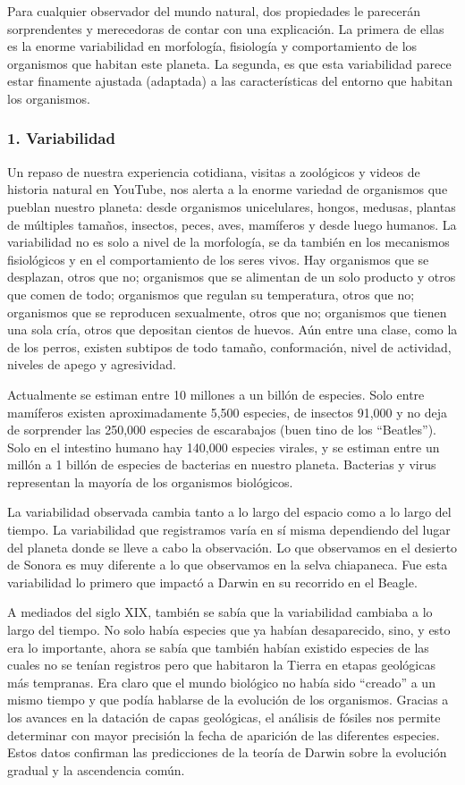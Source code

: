 \documentclass[
  a4paper,
  DIV=11,
  numbers=noendperiod]{scrreprt}
\begin{document}
Para cualquier observador del mundo natural, dos propiedades le
parecerán sorprendentes y merecedoras de contar con una explicación. La
primera de ellas es la enorme variabilidad en morfología, fisiología y
comportamiento de los organismos que habitan este planeta. La segunda,
es que esta variabilidad parece estar finamente ajustada (adaptada) a
las características del entorno que habitan los organismos.

\subsubsection{1. Variabilidad}\label{variabilidad}

Un repaso de nuestra experiencia cotidiana, visitas a zoológicos y
videos de historia natural en YouTube, nos alerta a la enorme variedad
de organismos que pueblan nuestro planeta: desde organismos
unicelulares, hongos, medusas, plantas de múltiples tamaños, insectos,
peces, aves, mamíferos y desde luego humanos. La variabilidad no es solo
a nivel de la morfología, se da también en los mecanismos fisiológicos y
en el comportamiento de los seres vivos. Hay organismos que se
desplazan, otros que no; organismos que se alimentan de un solo producto
y otros que comen de todo; organismos que regulan su temperatura, otros
que no; organismos que se reproducen sexualmente, otros que no;
organismos que tienen una sola cría, otros que depositan cientos de
huevos. Aún entre una clase, como la de los perros, existen subtipos de
todo tamaño, conformación, nivel de actividad, niveles de apego y
agresividad.

Actualmente se estiman entre 10 millones a un billón de especies. Solo
entre mamíferos existen aproximadamente 5,500 especies, de insectos
91,000 y no deja de sorprender las 250,000 especies de escarabajos (buen
tino de los ``Beatles''). Solo en el intestino humano hay 140,000
especies virales, y se estiman entre un millón a 1 billón de especies de
bacterias en nuestro planeta. Bacterias y virus representan la mayoría
de los organismos biológicos.

La variabilidad observada cambia tanto a lo largo del espacio como a lo
largo del tiempo. La variabilidad que registramos varía en sí misma
dependiendo del lugar del planeta donde se lleve a cabo la observación.
Lo que observamos en el desierto de Sonora es muy diferente a lo que
observamos en la selva chiapaneca. Fue esta variabilidad lo primero que
impactó a Darwin en su recorrido en el Beagle.

A mediados del siglo XIX, también se sabía que la variabilidad cambiaba
a lo largo del tiempo. No solo había especies que ya habían
desaparecido, sino, y esto era lo importante, ahora se sabía que también
habían existido especies de las cuales no se tenían registros pero que
habitaron la Tierra en etapas geológicas más tempranas. Era claro que el
mundo biológico no había sido ``creado'' a un mismo tiempo y que podía
hablarse de la evolución de los organismos. Gracias a los avances en la
datación de capas geológicas, el análisis de fósiles nos permite
determinar con mayor precisión la fecha de aparición de las diferentes
especies. Estos datos confirman las predicciones de la teoría de Darwin
sobre la evolución gradual y la ascendencia común.
\end{document}
